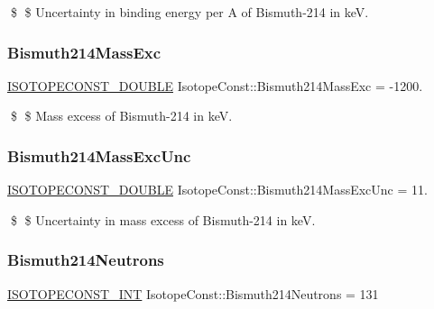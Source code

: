 \$ \$ Uncertainty in binding energy per A of Bismuth-\/214 in keV. \mbox{\label{group___isotope_const-_bismuth-_bi214_ga9af84f24643ef365029d0fbb5612f285}} 
\subsubsection{\texorpdfstring{Bismuth214\+Mass\+Exc}{Bismuth214MassExc}}
{\footnotesize\ttfamily \mbox{\hyperlink{group___isotope_const-_macros_ga8f45a7272ce02c0b4c65c44636ed719a}{I\+S\+O\+T\+O\+P\+E\+C\+O\+N\+S\+T\+\_\+\+D\+O\+U\+B\+LE}} Isotope\+Const\+::\+Bismuth214\+Mass\+Exc = -\/1200.}

\$ \$ Mass excess of Bismuth-\/214 in keV. \mbox{\label{group___isotope_const-_bismuth-_bi214_ga68ab9bef13144eb2f032e49246421e38}} 
\subsubsection{\texorpdfstring{Bismuth214\+Mass\+Exc\+Unc}{Bismuth214MassExcUnc}}
{\footnotesize\ttfamily \mbox{\hyperlink{group___isotope_const-_macros_ga8f45a7272ce02c0b4c65c44636ed719a}{I\+S\+O\+T\+O\+P\+E\+C\+O\+N\+S\+T\+\_\+\+D\+O\+U\+B\+LE}} Isotope\+Const\+::\+Bismuth214\+Mass\+Exc\+Unc = 11.}

\$ \$ Uncertainty in mass excess of Bismuth-\/214 in keV. \mbox{\label{group___isotope_const-_bismuth-_bi214_ga56a4f6ee4e8c03d3e53b5687f98eb56c}} 
\subsubsection{\texorpdfstring{Bismuth214\+Neutrons}{Bismuth214Neutrons}}
{\footnotesize\ttfamily \mbox{\hyperlink{group___isotope_const-_macros_ga5f18360b3e99483a35c32d789e62621c}{I\+S\+O\+T\+O\+P\+E\+C\+O\+N\+S\+T\+\_\+\+I\+NT}} Isotope\+Const\+::\+Bismuth214\+Neutrons = 131}

